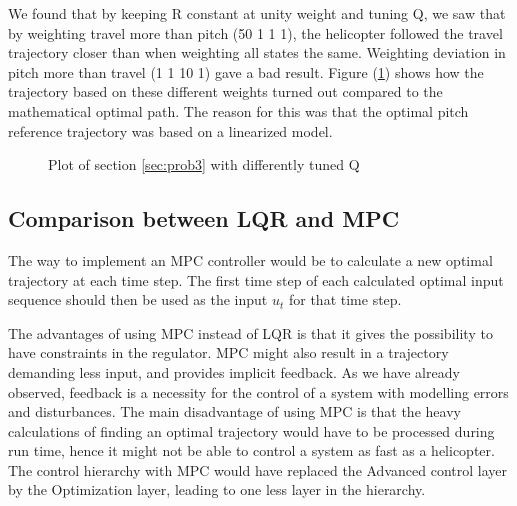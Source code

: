 We found that by keeping R constant at unity weight and tuning Q, we saw that by weighting travel more than pitch (50 1 1 1), the helicopter followed the travel trajectory closer than when weighting all states the same. Weighting deviation in pitch more than travel (1 1 10 1) gave a bad result. Figure (\ref{fig:day3_plot_allQ}) shows how the trajectory based on these different weights turned out compared to the mathematical optimal path. The reason for this was that the optimal pitch reference trajectory was based on a linearized model.

\begin{figure}[htb]
	\centering
	\caption{Plot of section \ref{sec:prob3} with differently tuned Q}
	\label{fig:day3_plot_allQ}
\end{figure}




\subsection{Comparison between LQR and MPC}
The way to implement an MPC controller would be to calculate a new optimal trajectory at each time step. The first time step of each calculated optimal input sequence should then be used as the input $u_t$ for that time step.

The advantages of using MPC instead of LQR is that it gives the possibility to have constraints in the regulator. MPC might also result in a trajectory demanding less input, and provides implicit feedback. As we have already observed, feedback is a necessity for the control of a system with modelling errors and disturbances.
The main disadvantage of using MPC is that the heavy calculations of finding an optimal trajectory would have to be processed during run time, hence it might not be able to control a system as fast as a helicopter.
The control hierarchy with MPC would have replaced the Advanced control layer by the Optimization layer, leading to one less layer in the hierarchy.
